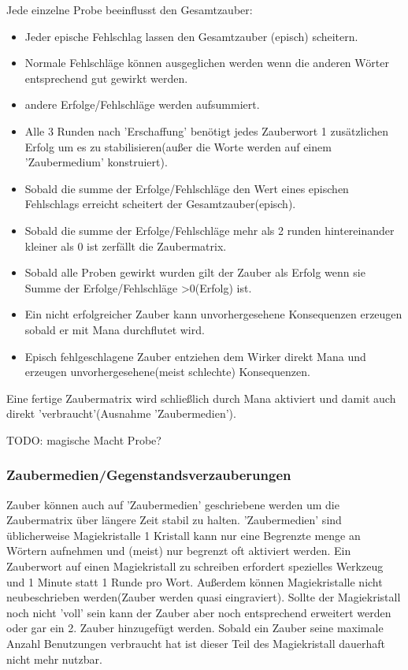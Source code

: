 Jede einzelne Probe beeinflusst den Gesamtzauber:
\begin{itemize}
\item Jeder epische Fehlschlag lassen den Gesamtzauber (episch) scheitern.
\item Normale Fehlschläge können ausgeglichen werden wenn die anderen Wörter entsprechend gut gewirkt werden.
\item andere Erfolge/Fehlschläge werden aufsummiert.
\item Alle 3 Runden nach 'Erschaffung' benötigt jedes Zauberwort 1 zusätzlichen Erfolg um es zu stabilisieren(außer die Worte werden auf einem 'Zaubermedium' konstruiert).
\item Sobald die summe der Erfolge/Fehlschläge den Wert eines epischen Fehlschlags erreicht scheitert der Gesamtzauber(episch).
\item Sobald die summe der Erfolge/Fehlschläge mehr als 2 runden hintereinander kleiner als 0 ist zerfällt die Zaubermatrix.
\item Sobald alle Proben gewirkt wurden gilt der Zauber als Erfolg wenn sie Summe der Erfolge/Fehlschläge >0(Erfolg) ist.
\item Ein nicht erfolgreicher Zauber kann unvorhergesehene Konsequenzen erzeugen sobald er mit Mana durchflutet wird.
\item Episch fehlgeschlagene Zauber entziehen dem Wirker direkt Mana und erzeugen unvorhergesehene(meist schlechte) Konsequenzen.
\end{itemize}

Eine fertige Zaubermatrix wird schließlich durch Mana aktiviert und damit auch direkt 'verbraucht'(Ausnahme 'Zaubermedien').

TODO: magische Macht Probe?

\subsubsection{Zaubermedien/Gegenstandsverzauberungen}
Zauber können auch auf 'Zaubermedien' geschriebene werden um die Zaubermatrix über längere Zeit stabil zu halten.
'Zaubermedien' sind üblicherweise Magiekristalle 1 Kristall kann nur eine Begrenzte menge an Wörtern aufnehmen und (meist) nur begrenzt oft aktiviert werden. Ein Zauberwort auf einen Magiekristall zu schreiben erfordert spezielles Werkzeug und 1 Minute statt 1 Runde pro Wort.
Außerdem können Magiekristalle nicht neubeschrieben werden(Zauber werden quasi eingraviert). Sollte der Magiekristall noch nicht 'voll' sein kann der Zauber aber noch entsprechend erweitert werden oder gar ein 2. Zauber hinzugefügt werden.
Sobald ein Zauber seine maximale Anzahl Benutzungen verbraucht hat ist dieser Teil des Magiekristall dauerhaft nicht mehr nutzbar.

